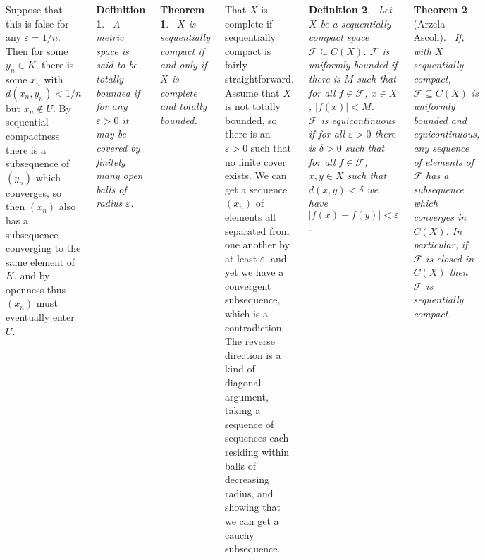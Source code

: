 \documentclass{tikzposter} %
\newtheorem{theorem}{Theorem}
\newtheorem{definition}{Definition}
\begin{document}
\begin{columns}
{    Suppose that this is false for any $\varepsilon = 1/n$. Then for some $y_{n} \in K$, there is some $x_{n}$ with $d(x_{n},y_{n}) < 1/n$ but $x_{n} \notin U$. By sequential compactness there is a subsequence of $(y_{n})$ which converges, so then $(x_{n})$ also has a subsequence converging to the same element of $K$, and by openness thus $(x_{n})$ must eventually enter $U$. \\

    \begin{definition}
    \ A metric space is said to be totally bounded if for any $\varepsilon > 0$ it may be covered by finitely many open balls of radius $\varepsilon$.
    \end{definition}
    \hphantom{}

    \begin{theorem}
    \ $X$ is sequentially compact if and only if $X$ is complete and totally bounded.
    \end{theorem}
    \hphantom{}

    That $X$ is complete if sequentially compact is fairly straightforward. Assume that $X$ is not totally bounded, so there is an $\varepsilon > 0$ such that no finite cover exists. We can get a sequence $(x_{n})$ of elements all separated from one another by at least $\varepsilon$, and yet we have a convergent subsequence, which is a contradiction. \\

    The reverse direction is a kind of diagonal argument, taking a sequence of sequences each residing within balls of decreasing radius, and showing that we can get a cauchy subsequence. \\

    \begin{definition}
    \ Let $X$ be a sequentially compact space $\mathcal{F} \subseteq C(X)$. $\mathcal{F}$ is uniformly bounded if there is $M$ such that for all $f \in \mathcal{F}$, $x \in X$, $|f(x)| < M$. \\

      $\mathcal{F}$ is equicontinuous if for all $\varepsilon > 0$ there is $\delta > 0$ such that for all $f \in \mathcal{F}$, $x, y \in X$ such that $d(x,y) < \delta$ we have $|f(x)-f(y)| < \varepsilon$.
    \end{definition}
    \hphantom{}

    \begin{theorem}[Arzela-Ascoli]
    \ If, with $X$ sequentially compact, $\mathcal{F} \subseteq C(X)$ is uniformly bounded and equicontinuous, any sequence of elements of $\mathcal{F}$ has a subsequence which converges in $C(X)$. In particular, if $\mathcal{F}$ is closed in $C(X)$ then $\mathcal{F}$ is sequentially compact.
    \end{theorem}
    \hphantom{}

}
\end{columns}
\end{document}
